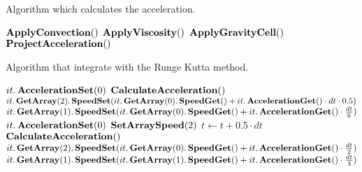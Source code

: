 \begin{algorithm}
\caption{Algorithm which calculates the acceleration.}
\label{code:CalculateAcceleration}
\begin{algorithmic}[1]
   {}
	\State $\mathop{\textbf{ApplyConvection}}()$
	\State $\mathop{\textbf{ApplyViscosity}}()$
	\State $\mathop{\textbf{ApplyGravityCell}}()$
	\State $\mathop{\textbf{ProjectAcceleration}}()$
	\EndProcedure
 \end{algorithmic}
\end{algorithm}

\begin{algorithm}
\caption{Algorithm that integrate with the Runge Kutta method.}
\label{code:RungeKutta}
\begin{algorithmic}[1]
            \State $it.\mathop{\textbf{AccelerationSet}}(0)$
\EndFor
	\State $\mathop{\textbf{CalculateAcceleration}}()$
            \State $it.\mathop{\textbf{GetArray}}(2).\mathop{\textbf{SpeedSet}}(it.\mathop{\textbf{GetArray}}(0).\mathop{\textbf{SpeedGet}}()+it.\mathop{\textbf{AccelerationGet}}()\cdot dt \cdot 0.5)$
            \State $it.\mathop{\textbf{GetArray}}(1).\mathop{\textbf{SpeedSet}}(it.\mathop{\textbf{GetArray}}(0).\mathop{\textbf{SpeedGet}}()+it.\mathop{\textbf{AccelerationGet}}()\cdot \frac{dt}{6})$
        \EndFor
            \State $it.\mathop{\textbf{AccelerationSet}}(0)$
        \EndFor
        \State $\mathop{\textbf{SetArraySpeed}}(2)$
        \State $t\gets t+0.5\cdot dt$
        \State $\mathop{\textbf{CalculateAcceleration}}()$
            \State $it.\mathop{\textbf{GetArray}}(2).\mathop{\textbf{SpeedSet}}(it.\mathop{\textbf{GetArray}}(0).\mathop{\textbf{SpeedGet}}()+it.\mathop{\textbf{AccelerationGet}}()\cdot \frac{dt}{2})$
            \State $it.\mathop{\textbf{GetArray}}(1).\mathop{\textbf{SpeedSet}}(it.\mathop{\textbf{GetArray}}(1).\mathop{\textbf{SpeedGet}}()+it.\mathop{\textbf{AccelerationGet}}()\cdot \frac{dt}{3})$
       \EndFor

\end{algorithmic}
\end{algorithm}
